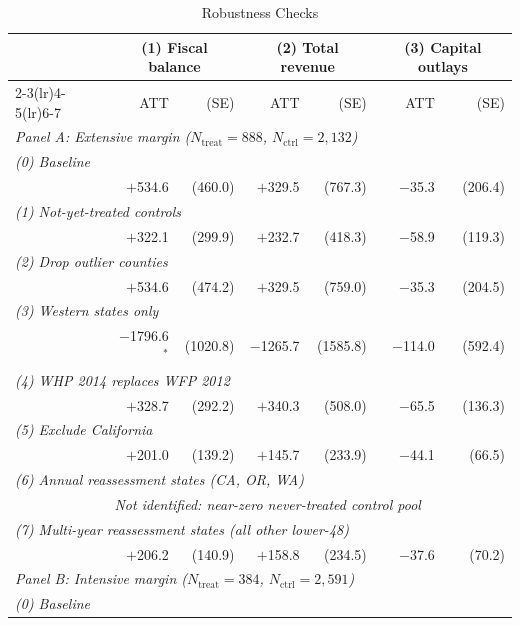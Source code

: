 \documentclass[12pt]{article}
\begin{document}
\begin{table}[h!]
\begin{threeparttable}
\caption{Robustness Checks}
\label{tab:robustness}
\centering
\small
\begin{tabular}{lrrrrrr}
\toprule
 & \multicolumn{2}{c}{(1) Fiscal balance} &
   \multicolumn{2}{c}{(2) Total revenue} &
   \multicolumn{2}{c}{(3) Capital outlays} \\
\cmidrule(lr){2-3}\cmidrule(lr){4-5}\cmidrule(lr){6-7}
 & ATT & (SE) & ATT & (SE) & ATT & (SE) \\
\midrule
\multicolumn{7}{l}{\textit{Panel A: Extensive margin ($N_{\text{treat}}=888$, $N_{\text{ctrl}}=2,132$)}} \\
\multicolumn{7}{l}{\textit{(0) Baseline}} \\
 & $+$534.6 & (460.0) & $+$329.5 & (767.3) & $-$35.3 & (206.4) \\
\multicolumn{7}{l}{\textit{(1) Not-yet-treated controls}} \\
 & $+$322.1 & (299.9) & $+$232.7 & (418.3) & $-$58.9 & (119.3) \\
\multicolumn{7}{l}{\textit{(2) Drop outlier counties}} \\
 & $+$534.6 & (474.2) & $+$329.5 & (759.0) & $-$35.3 & (204.5) \\
\multicolumn{7}{l}{\textit{(3) Western states only}} \\
 & $-$1796.6$^{*}$ & (1020.8) & $-$1265.7 & (1585.8) & $-$114.0 & (592.4) \\
\multicolumn{7}{l}{\textit{(4) WHP 2014 replaces WFP 2012}} \\
 & $+$328.7 & (292.2) & $+$340.3 & (508.0) & $-$65.5 & (136.3) \\
\multicolumn{7}{l}{\textit{(5) Exclude California}} \\
 & $+$201.0 & (139.2) & $+$145.7 & (233.9) & $-$44.1 & (66.5) \\
\multicolumn{7}{l}{\textit{(6) Annual reassessment states (CA, OR, WA)}} \\
 & \multicolumn{6}{l}{\textit{Not identified: near-zero never-treated control pool}} \\
\multicolumn{7}{l}{\textit{(7) Multi-year reassessment states (all other lower-48)}} \\
 & $+$206.2 & (140.9) & $+$158.8 & (234.5) & $-$37.6 & (70.2) \\
\midrule
\multicolumn{7}{l}{\textit{Panel B: Intensive margin ($N_{\text{treat}}=384$, $N_{\text{ctrl}}=2{,}591$)}} \\
\multicolumn{7}{l}{\textit{(0) Baseline}} \\

\end{tabular}
\end{threeparttable}
\end{table}
\end{document}
